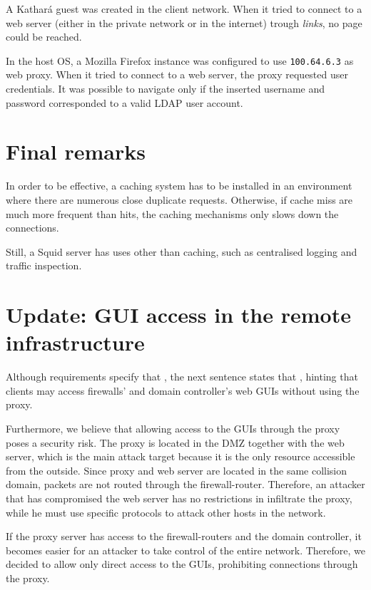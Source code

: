 \documentclass{homework}
\newcommand{\kat}{Kathará\xspace}
\newcommand{\sq}{Squid\xspace}
\begin{document}
    A \kat guest was created in the client network.
    When it tried to connect to a web server (either in the private network or in the internet) trough \textit{links}, no page could be reached.
    
    In the host OS, a Mozilla Firefox instance was configured to use \texttt{100.64.6.3} as web proxy.
    When it tried to connect to a web server, the proxy requested user credentials.
    It was possible to navigate only if the inserted username and password corresponded to a valid LDAP user account.
    
    
    \section{Final remarks}
    In order to be effective, a caching system has to be installed in an environment where there are numerous close duplicate requests.
    Otherwise, if cache miss are much more frequent than hits, the caching mechanisms only slows down the connections.
    
    Still, a \sq server has uses other than caching, such as centralised logging and traffic inspection.
    
    \section{Update: GUI access in the remote infrastructure}
    Although requirements specify that , the next sentence states that , hinting that clients may access firewalls' and domain controller's web GUIs without using the proxy.
    
    Furthermore, we believe that allowing access to the GUIs through the proxy poses a security risk. The proxy is located in the DMZ together with the web server, which is the main attack target because it is the only resource accessible from the outside.
    Since proxy and web server are located in the same collision domain, packets are not routed through the firewall-router.
    Therefore, an attacker that has compromised the web server has no restrictions in infiltrate the proxy, while he must use specific protocols to attack other hosts in the network.
    
    If the proxy server has access to the firewall-routers and the domain controller, it becomes easier for an attacker to take control of the entire network.
    Therefore, we decided to allow only direct access to the GUIs, prohibiting connections through the proxy.
\end{document}
